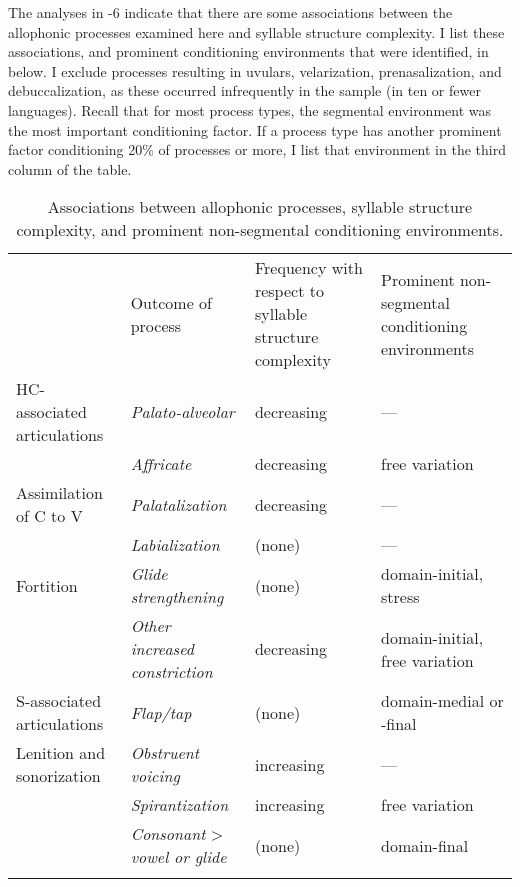   The analyses in -6 indicate that there are some associations between the allophonic processes examined here and syllable structure complexity. I list these associations, and prominent conditioning environments that were identified, in  below. I exclude processes resulting in uvulars, velarization, prenasalization, and debuccalization, as these occurred infrequently in the sample (in ten or fewer languages). Recall that for most process types, the segmental environment was the most important conditioning factor. If a process type has another prominent factor conditioning 20\% of processes or more, I list that environment in the third column of the table.

\begin{table}
\begin{tabularx}{\textwidth}{XXXX}
\lsptoprule
 & Outcome of process & Frequency with respect to syllable structure complexity & Prominent non-segmental conditioning environments\\
HC-associated articulations & \textit{Palato-alveolar} & decreasing & —\\
\hhline{-~~~} & \textit{Affricate} & decreasing & free variation\\
Assimilation of C to V & \textit{Palatalization} & decreasing & —\\
\hhline{-~~~} & \textit{Labialization} & (none) & —\\
Fortition & \textit{Glide strengthening} & (none) & domain-initial, stress\\
\hhline{-~~~} & \textit{Other increased constriction} & decreasing & domain-initial, free variation\\
S-associated articulations & \textit{Flap/tap} & (none) & domain-medial or -final\\
Lenition and sonorization & \textit{Obstruent voicing} & increasing & —\\
\hhline{-~~~} & \textit{Spirantization} & increasing & free variation\\
& \textit{Consonant} > \textit{vowel or glide} & (none) & domain-final\\
\hhline{~---}
\lspbottomrule
\end{tabularx}
\caption{\label{tab:7.7}Associations between allophonic processes, syllable structure complexity, and prominent non-segmental conditioning environments.}
\end{table}

